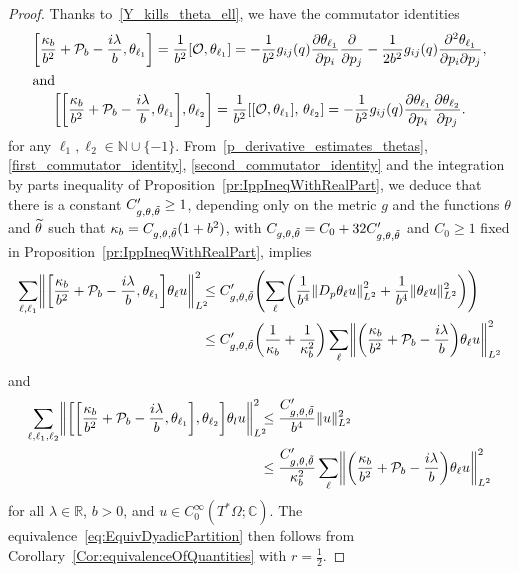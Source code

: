 \documentclass[AHL,Unicode,longabstracts]{cedram}
\newcommand{\C}{\mathbb{C}}
\newcommand{\R}{\mathbb{R}}
\newcommand{\N}{\mathbb{N}}
\newcommand{\clO}{\mathcal{O}}
\newcommand{\clP}{\mathcal{P}}
\newcommand\norm[1]{\left\lVert#1\right\rVert}
\let\oldtilde\tilde
\renewcommand*{\tilde}[1]{\mathchoice{\widetilde{#1}}{\widetilde{#1}}{\oldtilde{#1}}{\oldtilde{#1}}}
\let\originalleft\left
\let\originalright\right
\renewcommand{\left}{\mathopen{}\mathclose\bgroup\originalleft}
\renewcommand{\right}{\aftergroup\egroup\originalright}
\begin{document}
\begin{proof}
Thanks to~\eqref{Y_kills_theta_ell}, we have the commutator identities
\begin{gather}
\left[\frac{\kappa_{b}}{b^{2}}+\clP_{b}-\frac{i\lambda}{b},\theta_{\ell_{1}} \right] = \frac{1}{b^{2}}[\clO,\theta_{\ell_{1}}] = -\frac{1}{b^{2}}g_{ij}(q)\frac{\partial \theta_{\ell_{1}}}{\partial p_{i}} \frac{\partial}{\partial p_{j}}-\frac{1}{2b^{2}}g_{ij}(q)\frac{\partial^{2} \theta_{\ell_{1}}}{\partial p_{i} \partial p_{j}},
\label{first_commutator_identity}
\\
\intertext{and}
\left[\left[\frac{\kappa_{b}}{b^{2}}+\clP_{b}-\frac{i\lambda}{b},\theta_{\ell_{1}}\right],\theta_{\ell_{2}}\right] =\frac{1}{b^{2}}[[\clO,\theta_{\ell_{1}}],\,\theta_{\ell_{2}}] = -\frac{1}{b^{2}}g_{ij}(q) \frac{\partial \theta_{\ell_{1}}}{\partial p_{i}} \frac{\partial \theta_{\ell_{2}}}{\partial p_{j}}.\label{second_commutator_identity}
\end{gather}
for any $\ell_1, \ell_2 \in \N \cup \{-1\}$. From~\eqref{p_derivative_estimates_thetas}, \eqref{first_commutator_identity}, \eqref{second_commutator_identity} and the integration by parts inequality of Proposition~\ref{pr:IppIneqWithRealPart}, we deduce that there is a constant $C'_{g, \theta, \tilde{\theta}} \ge 1$, depending only on the metric $g$ and the functions $\theta$ and $\tilde{\theta}$ such that $\kappa_b = C_{g, \theta, \tilde{\theta}}(1+b^2)$, with $C_{g, \theta, \tilde{\theta}} = C_{0}+32C'_{g, \theta, \tilde{\theta}}$ and $C_0\geq 1$ fixed in Proposition~\ref{pr:IppIneqWithRealPart}, implies
\begin{align}
\sum_{\ell,\ell_{1}} \norm{\left[\frac{\kappa_{b}}{b^{2}}+\clP_{b}-\frac{i\lambda}{b},\theta_{\ell_{1}} \right] \theta_{\ell} u}^{2}_{L^2}\mkern-10mu
& \leq C'_{g,\theta, \tilde{\theta}}
\left(
\sum_{\ell} \left(\frac{1}{b^{4}}\left\|D_{p}\theta_{\ell}u\right\|^{2}_{L^2} + \frac{1}{b^{4}}\| \theta_{\ell}u\|^{2}_{L^2} \right) \right) \\
& \leq C'_{g,\theta, \tilde{\theta}} \left(\frac{1}{\kappa_{b}}+\frac{1}{\kappa_{b}^{2}}\right) \sum_{\ell} \norm{ \left(\frac{\kappa_{b}}{b^{2}}+\clP_{b}-\frac{i\lambda}{b}\right) \theta_{\ell}u}^{2}_{L^2}\notag
\end{align}
and
\begin{align}
\sum_{\ell,\ell_{1},\ell_{2}} \norm{\left[\left[\frac{\kappa_{b}}{b^{2}}+\clP_{b}-\frac{i\lambda}{b},\theta_{\ell_{1}} \right],\theta_{\ell_{2}} \right] \theta_{l}u}^{2}_{L^2}\mkern-10mu
&\leq \frac{C'_{g,\theta, \tilde{\theta}}}{b^{4}} \|u\|^{2}_{L^2} \\
&\leq \frac{C'_{g,\theta, \tilde{\theta}}}{\kappa_{b}^{2}}\sum_{\ell} \norm{ \left(\frac{\kappa_{b}}{b^{2}}+\clP_{b}-\frac{i\lambda}{b}\right) \theta_{\ell}u}^{2}_{L^2}\notag
\end{align}
for all $\lambda \in \R$, $b>0$, and $u \in C^\infty_0(T^* \Omega; \C)$. The equivalence~\eqref{eq:EquivDyadicPartition} then follows from Corollary~\ref{Cor:equivalenceOfQuantities} with $r=\frac{1}{2}$.
\end{proof}
\end{document}
